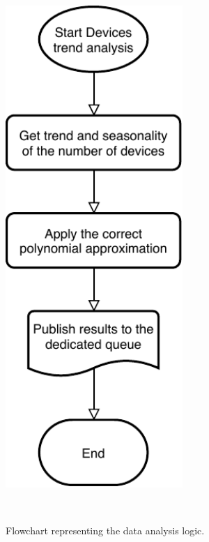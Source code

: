 \begin{figure}
\begin{minipage}[b]{8.5cm}
\centering
\includegraphics[width=0.6\textwidth]{images/flowML}
\caption{Flowchart representing the data analysis logic.}
\label{fig:flowML}
\end{minipage}
\ \hspace{2mm} \hspace{3mm} \
\begin{minipage}[b]{8.5cm}
\centering

\end{minipage}
\end{figure}
